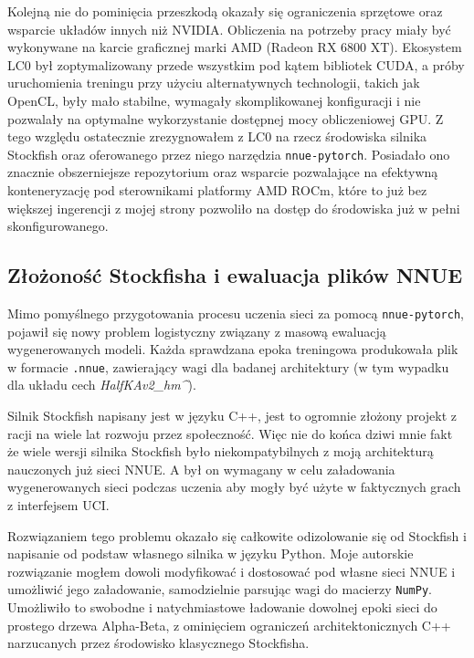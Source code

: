 \documentclass[12pt,a4paper]{report}
\begin{document}
Kolejną nie do pominięcia przeszkodą okazały się ograniczenia sprzętowe oraz wsparcie układów innych niż NVIDIA. Obliczenia na potrzeby pracy miały być wykonywane na karcie graficznej marki AMD (Radeon RX 6800 XT). Ekosystem LC0 był zoptymalizowany przede wszystkim pod kątem bibliotek CUDA, a próby uruchomienia treningu przy użyciu alternatywnych technologii, takich jak OpenCL, były mało stabilne, wymagały skomplikowanej konfiguracji i nie pozwalały na optymalne wykorzystanie dostępnej mocy obliczeniowej GPU. Z tego względu ostatecznie zrezygnowałem z LC0 na rzecz środowiska silnika Stockfish oraz oferowanego przez niego narzędzia \texttt{nnue-pytorch}. Posiadało ono znacznie obszerniejsze repozytorium oraz wsparcie pozwalające na efektywną konteneryzację pod sterownikami platformy AMD ROCm, które to już bez większej ingerencji z mojej strony pozwoliło na dostęp do środowiska już w pełni skonfigurowanego.

\subsection{Złożoność Stockfisha i ewaluacja plików NNUE}

Mimo pomyślnego przygotowania procesu uczenia sieci za pomocą \texttt{nnue-pytorch}, pojawił się nowy problem logistyczny związany z masową ewaluacją wygenerowanych modeli. Każda sprawdzana epoka treningowa produkowała plik w formacie \texttt{.nnue}, zawierający wagi dla badanej architektury (w tym wypadku dla układu cech \textit{HalfKAv2\_hm\string^}).

Silnik Stockfish napisany jest w języku C++, jest to ogromnie złożony projekt z racji na wiele lat rozwoju przez społeczność. Więc nie do końca dziwi mnie fakt że wiele wersji silnika Stockfish było niekompatybilnych z moją architekturą nauczonych już sieci NNUE. A był on wymagany w celu załadowania wygenerowanych sieci podczas uczenia aby mogły być użyte w faktycznych grach z interfejsem UCI. 

Rozwiązaniem tego problemu okazało się całkowite odizolowanie się od Stockfish i napisanie od podstaw własnego silnika w języku Python. Moje autorskie rozwiązanie mogłem dowoli modyfikować i dostosować pod własne sieci NNUE i umożliwić jego załadowanie, samodzielnie parsując wagi do macierzy \texttt{NumPy}. Umożliwiło to swobodne i natychmiastowe ładowanie dowolnej epoki sieci do prostego drzewa Alpha-Beta, z ominięciem ograniczeń architektonicznych C++ narzucanych przez środowisko klasycznego Stockfisha.
\end{document}
